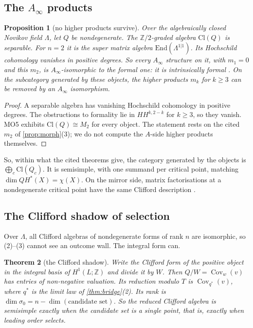 \documentclass[11pt]{article}
\newtheorem{theorem}{Theorem}\newtheorem{proposition}[theorem]{Proposition}\newtheorem{lemma}[theorem]{Lemma}\newtheorem{corollary}[theorem]{Corollary}\newtheorem{conjecture}[theorem]{Conjecture}\crefname{conjecture}{Conjecture}{Conjectures}
\theoremstyle{definition}\newtheorem{definition}[theorem]{Definition}\newtheorem{remark}[theorem]{Remark}\newtheorem{example}[theorem]{Example}\newtheorem{problem}[theorem]{Open problem}\crefname{problem}{Problem}{Problems}
\begin{document}
\subsection{The \texorpdfstring{$A_\infty$}{A-infinity} products}
\begin{proposition}[no higher products survive]\label{prop:formal}
Over the algebraically closed Novikov field $\Lambda$, let $Q$ be nondegenerate. The $\mathbb Z/2$-graded algebra $\mathrm{Cl}(Q)$ is separable. For $n=2$ it is the super matrix algebra $\mathrm{End}(\Lambda^{1|1})$. Its
Hochschild cohomology vanishes in positive degrees. So every $A_\infty$ structure on it, with $m_1=0$ and this $m_2$, is $A_\infty$-isomorphic to the formal one: it is intrinsically formal
\cite{Kadeishvili1980,SeidelThomas2001}. On the subcategory generated by these objects, the higher products $m_k$ for $k\ge3$ can be removed by an $A_\infty$ isomorphism.
\end{proposition}

\begin{proof}
A separable algebra has vanishing Hochschild cohomology in positive degrees. The obstructions to formality lie in $HH^{k,2-k}$ for $k\ge3$, so they vanish. MO5 exhibits
$\mathrm{Cl}(Q)\cong M_2$ for every object. The statement rests on the cited $m_2$ of \cref{prop:morph}(3); we do not compute the $A$-side higher products themselves.
\end{proof}

So, within what the cited theorems give, the category generated by the objects is $\bigoplus_c\mathrm{Cl}(Q_c)$. It is semisimple, with one summand per critical point, matching $\dim QH^*(X)=\chi(X)$. On the
mirror side, matrix factorisations at a nondegenerate critical point have the same Clifford description \cite{Dyckerhoff2011}.

\subsection{The Clifford shadow of selection}
Over $\Lambda$, all Clifford algebras of nondegenerate forms of rank $n$ are isomorphic, so (2)--(3) cannot see an outcome wall. The integral form can.

\begin{theorem}[the Clifford shadow]\label{thm:shadow}
Write the Clifford form of the positive object in the integral basis of $H^1(L;\mathbb Z)$ and divide it by $W$. Then $Q/W=\operatorname{Cov}_w(v)$ has entries of non-negative valuation. Its reduction modulo
$T$ is $\operatorname{Cov}_{q^*}(v)$, where $q^*$ is the limit law of \cref{thm:bridge}(2). Its rank is $\dim\sigma_0=n-\dim(\text{candidate set})$. So the reduced Clifford algebra is semisimple exactly when the
candidate set is a single point, that is, exactly when leading order selects.
\end{theorem}
\end{document}
